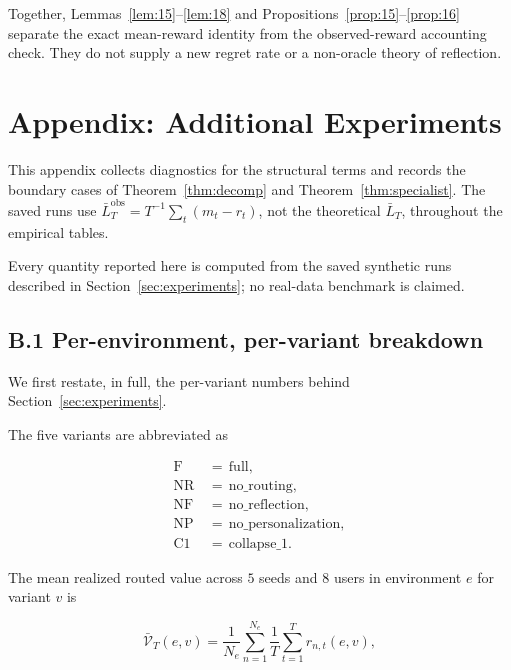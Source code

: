 \documentclass{article} %
\begin{document}
Together, Lemmas~\ref{lem:15}--\ref{lem:18} and
Propositions~\ref{prop:15}--\ref{prop:16} separate the exact mean-reward
identity from the observed-reward accounting check. They do not supply a new
regret rate or a non-oracle theory of reflection.

\section{Appendix: Additional Experiments}

\label{app:experiments}

This appendix collects diagnostics for the structural terms and records the
boundary cases of Theorem~\ref{thm:decomp} and
Theorem~\ref{thm:specialist}. The saved runs use
\(\bar L_T^{\mathrm{obs}}=T^{-1}\sum_t(m_t-r_t)\), not the theoretical
\(\bar L_T\), throughout the empirical tables.

Every quantity reported here is computed from the saved synthetic runs described in Section~\ref{sec:experiments}; no real-data benchmark is claimed.

\subsection{B.1 Per-environment, per-variant breakdown}

\label{app:per-variant}

We first restate, in full, the per-variant numbers behind Section~\ref{sec:experiments}.

The five variants are abbreviated as

\begin{align}
\label{eq:app-variants}
\mathrm{F} &\,=\, \mathrm{full},\\
\mathrm{NR} &\,=\, \mathrm{no\_routing},\\
\mathrm{NF} &\,=\, \mathrm{no\_reflection},\\
\mathrm{NP} &\,=\, \mathrm{no\_personalization},\\
\mathrm{C1} &\,=\, \mathrm{collapse\_1}.
\end{align}

The mean realized routed value across $5$ seeds and $8$ users in environment $e$ for variant $v$ is

\begin{equation}
\label{eq:app-mean-reward-def}
\bar{\mathcal{V}}_T(e,v) = \frac{1}{N_e}\sum_{n=1}^{N_e}\frac{1}{T}\sum_{t=1}^{T}r_{n,t}(e,v),
\end{equation}
\end{document}

